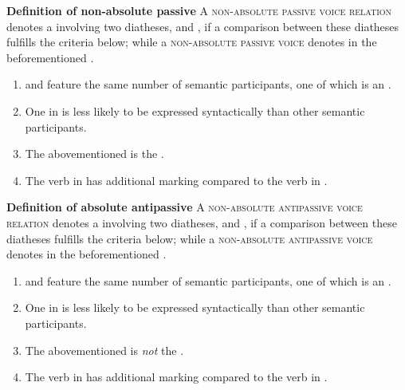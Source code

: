 \eanoraggedright
		\textbf{Definition of non-absolute passive} \newline
		A \textsc{non-absolute passive voice relation} denotes a  involving two diatheses,  and , if a comparison between these diatheses fulfills the criteria below; while a \textsc{non-absolute passive voice} denotes  in the beforementioned .
		\begin{enumerate}[label=\roman*)]
			\item {} and  feature the same number of semantic participants, one of which is an .
			\item One  in  is less likely to be expressed syntactically than other semantic participants.
			\item The abovementioned  is the .
			\item The verb in  has additional marking compared to the verb in .
		\end{enumerate}
\z

\eanoraggedright
		\textbf{Definition of absolute antipassive} \newline
		A \textsc{non-absolute antipassive voice relation} denotes a  involving two diatheses,  and , if a comparison between these diatheses fulfills the criteria below; while a \textsc{non-absolute antipassive voice} denotes  in the beforementioned .
		\begin{enumerate}[label=\roman*)]
			\item {} and  feature the same number of semantic participants, one of which is an .
			\item One  in  is less likely to be expressed syntactically than other semantic participants.
			\item The abovementioned  is \textit{not} the .
			\item The verb in  has additional marking compared to the verb in .
                \end{enumerate}
\z

